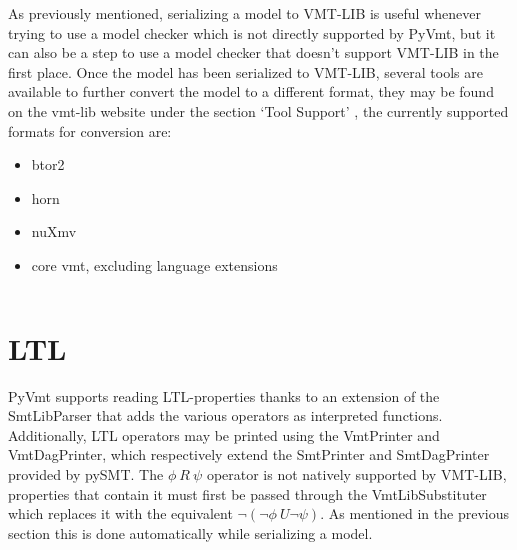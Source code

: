 As previously mentioned, serializing a model to VMT-LIB is useful whenever trying to use a model checker which is not directly supported by PyVmt, but it can also be a step to use a model checker that doesn't support VMT-LIB in the first place.
Once the model has been serialized to VMT-LIB, several tools are available to further convert the model to a different format, they may be found on the vmt-lib website under the section `Tool Support' \cite{VMT-LIB}, the currently supported formats for conversion are:
\begin{itemize}
    \item btor2
    \item horn
    \item nuXmv
    \item core vmt, excluding language extensions
\end{itemize}

\inputminted[firstline=37, lastline=38]{python3}{py/vmtlib_support.py}

\section{LTL}
PyVmt supports reading LTL-properties thanks to an extension of the SmtLibParser that adds the various operators as interpreted functions. Additionally, LTL operators may be printed using the VmtPrinter and VmtDagPrinter, which respectively extend the SmtPrinter and SmtDagPrinter provided by pySMT. The \begin{math}\phi\ R\ \psi\end{math} operator is not natively supported by VMT-LIB, properties that contain it must first be passed through the VmtLibSubstituter which replaces it with the equivalent \begin{math}\lnot (\lnot \phi\ U \lnot \psi) \end{math}. As mentioned in the previous section this is done automatically while serializing a model.


